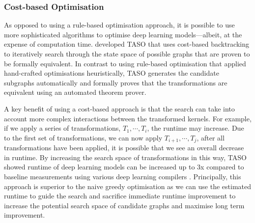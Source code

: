 

\subsubsection{Cost-based Optimisation}
\label{sec:bg:subsec:cbo}

As opposed to using a rule-based optimisation approach, it is possible to use more sophisticated algorithms to optimise deep learning models---albeit, at the expense of computation time. \citet{jia2019taso} developed TASO that uses cost-based backtracking to iteratively search through the state space of possible graphs that are proven to be formally equivalent. In contrast to using rule-based optimisation that applied hand-crafted optimisations heuristically, TASO generates the candidate subgraphs automatically and formally proves that the transformations are equivalent using an automated theorem prover.



A key benefit of using a cost-based approach is that the search can take into account more complex interactions between the transformed kernels. For example, if we apply a series of transformations, $T_1, \cdots, T_i$, the runtime may increase. Due to the first set of transformations, we can now apply $T_{i + 1}, \cdots, T_{j}$, after all transformations have been applied, it is possible that we see an overall decrease in runtime. By increasing the search space of transformations in this way, TASO showed runtime of deep learning models can be increased up to 3x \cite{jia2019taso, jia2019optimizing} compared to baseline measurements using various deep learning compilers \cite{ chetlur2014cudnn, cublas2008, tensorrt2017}. Principally, this approach is superior to the naive greedy optimisation as we can use the estimated runtime to guide the search and sacrifice immediate runtime improvement to increase the potential search space of candidate graphs and maximise long term improvement.

